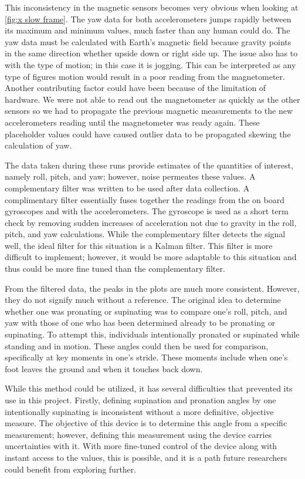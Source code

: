 This inconsistency in the magnetic sensors becomes very obvious when looking at \ref{fig:x slow frame}.
The yaw data for both accelerometers jumps rapidly between its maximum and minimum values, much faster than any human could do.
The yaw data must be calculated with Earth's magnetic field because gravity points in the same direction whether upside down or right side up.
The issue also has to with the type of motion; in this case it is jogging.
This can be interpreted as any type of figures motion would result in a poor reading from the magnetometer.
Another contributing factor could have been because of the limitation of hardware.
We were not able to read out the magnetometer as quickly as the other sensors so we had to propagate the previous magnetic measurements to the new accelerometers reading until the magnetometer was ready again.
These placeholder values could have caused outlier data to be propagated skewing the calculation of yaw.\par

The data taken during these runs provide estimates of the quantities of interest, namely roll, pitch, and yaw; however, noise permeates these values.
A complementary filter was written to be used after data collection.
A complimentary filter essentially fuses together the readings from the on board gyroscopes and with the accelerometers.
The gyroscope is used as a short term check by removing sudden increases of acceleration not due to gravity in the roll, pitch, and yaw calculations.
While the complementary filter detects the signal well, the ideal filter for this situation is a Kalman filter.
This filter is more difficult to implement; however, it would be more adaptable to this situation and thus could be more fine tuned than the complementary filter.\par

From the filtered data, the peaks in the plots are much more consistent.
However, they do not signify much without a reference.
The original idea to determine whether one was pronating or supinating was to compare one’s roll, pitch, and yaw with those of one who has been determined already to be pronating or supinating.
To attempt this, individuals intentionally pronated or supinated while standing and in motion.
These angles could then be used for comparison, specifically at key moments in one’s stride.
These moments include when one’s foot leaves the ground and when it touches back down.\par

While this method could be utilized, it has several difficulties that prevented its use in this project.
Firstly, defining supination and pronation angles by one intentionally supinating is inconsistent without a more definitive, objective measure.
The objective of this device is to determine this angle from a specific measurement; however, defining this measurement using the device carries uncertainties with it.
With more fine-tuned control of the device along with instant access to the values, this is possible, and it is a path future researchers could benefit from exploring further.\par

